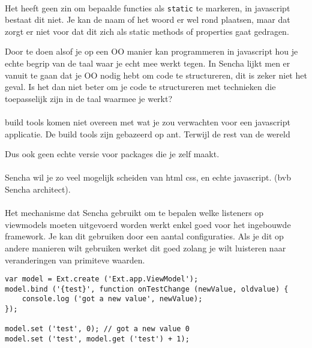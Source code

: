 \paragraph {} Het heeft geen zin om bepaalde functies als \lstinline{static} te markeren,
in javascript bestaat dit niet. Je kan de naam of het woord er wel rond plaatsen, maar dat
zorgt er niet voor dat dit zich als static methods of properties gaat gedragen.

Door te doen alsof je op een OO manier kan programmeren in javascript
hou je echte begrip van de taal waar je echt mee werkt tegen. In Sencha lijkt men er
vanuit te gaan dat je OO nodig hebt om code te structureren, dit is zeker niet het geval.
Is het dan niet beter om je code te structureren met technieken die toepasselijk zijn in
de taal waarmee je werkt?


\paragraph {} build tools komen niet overeen met wat je zou verwachten voor een javascript
applicatie. De build tools zijn gebazeerd op ant. Terwijl de rest van de wereld

Dus ook geen echte versie voor packages die je zelf maakt.


\paragraph {} Sencha wil je zo veel mogelijk scheiden van html css, en echte javascript.
(bvb Sencha architect).

\paragraph {} Het mechanisme dat Sencha gebruikt om te bepalen welke listeners op
viewmodels moeten uitgevoerd worden werkt enkel goed voor het ingebouwde framework. Je kan
dit gebruiken door een aantal configuraties. Als je dit op andere manieren wilt gebruiken
werket dit goed zolang je wilt luisteren naar veranderingen van primiteve waarden.

\begin{lstlisting}[language=ownjavascript]
var model = Ext.create ('Ext.app.ViewModel');
model.bind ('{test}', function onTestChange (newValue, oldvalue) {
	console.log ('got a new value', newValue);
});

model.set ('test', 0); // got a new value 0
model.set ('test', model.get ('test') + 1);
\end{lstlisting}

